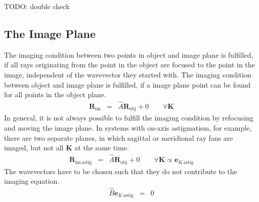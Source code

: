 \documentclass[12pt,a4paper,twoside,openright,BCOR10mm,headsepline,titlepage,abstracton,chapterprefix,final]{scrreprt}
\newcommand\Vector[1]{{\mathbf{#1}}}
\newcommand\im{\textrm{im}}
\newcommand\obj{\textrm{obj}}
\begin{document}
TODO: double check

\subsection{The Image Plane}
The imaging condition between two points in object and image plane is fulfilled,
if all rays originating from the point in the object are focused to the point in the image,
independent of the wavevector they started with.
The imaging condition between object and image plane is fulfilled,
if a image plane point can be found for all points in the object plane.
\begin{eqnarray}
 \Vector{R}_\im &=& \hat{A} \Vector{R}_\obj + 0 \qquad \forall \Vector{K}
\end{eqnarray}
In general, it is not always possible to fulfill the imaging condition 
by refocusing and moving the image plane.
In systems with on-axis astigmatism, for example, 
there are two separate planes, in which sagittal or meridional ray fans are imaged, but not all $\Vector{K}$ at the same time.
\begin{eqnarray}
 \Vector{R}_{\im\,\textrm{astig}} &=& \hat{A} \Vector{R}_\obj + 0 
 \qquad \forall \Vector{K} \propto \Vector{e}_{K\,\textrm{astig}}
\end{eqnarray}
The wavevectors have to be chosen such that they do not contribute to the imaging equation.
\begin{eqnarray}
 \hat{B} \Vector{e}_{K\,\textrm{astig}} &=& 0
\end{eqnarray}
\end{document}
